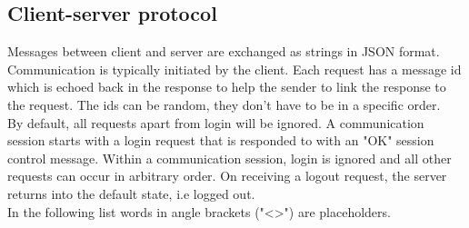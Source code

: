 \documentclass[oneside, english, final]{design}
\begin{document}
\newpage


\subsection{Client-server protocol}

Messages between client and server are exchanged as strings in JSON format.
Communication is typically initiated by the client. Each request has a message id which is echoed back in the response to help the sender to link the response to the request. The ids can be random, they don't have to be in a specific order.
\\
By default, all requests apart from login will be ignored.  A communication session starts with a login request that is responded to with an "OK" session control message. Within a communication session, login is ignored and all other requests can occur in arbitrary order. On receiving a logout request, the server returns into the default state, i.e logged out.
\\
In the following list words in angle brackets ("<>") are placeholders.
\\
\end{document}
